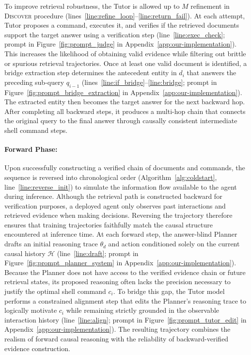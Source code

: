 \documentclass{article} %
\begin{document}
To improve retrieval robustness, the Tutor is allowed up to $M$ refinement in \textsc{Discover} procedure (lines~\ref{line:refine_loop}--\ref{line:return_fail}). At each attempt, Tutor proposes a command, executes it, and verifies if the retrieved documents support the target answer using a verification step (line~\ref{line:exec_check}; prompt in Figure~\ref{fig:prompt_judge} in Appendix~\ref{app:our-implementation}). This increases the likelihood of obtaining valid evidence while filtering out brittle or spurious retrieval trajectories. Once at least one valid document is identified, a bridge extraction step determines the antecedent entity in $d_i$ that answers the preceding sub-query $q_{i-1}$ (lines~\ref{line:if_bridge}--\ref{line:bridge}; prompt in Figure~\ref{fig:prompt_bridge_extraction} in Appendix~\ref{app:our-implementation}). The extracted entity then becomes the target answer for the next backward hop. After completing all backward steps, it produces a multi-hop chain that connects the original query to the final answer through causally consistent intermediate shell command steps.

\paragraph{Forward Phase:}

Upon successfully constructing a verified chain of documents and commands, the sequence is reversed into chronological order (Algorithm~\ref{alg:coldstart}, line~\ref{line:reverse_init}) to simulate the information flow available to the agent during inference. Although the retrieval path is constructed backward for verification purposes, a deployed agent only observes past interactions and retrieved evidence when making decisions. Reversing the trajectory therefore ensures that training trajectories faithfully match the causal structure encountered at inference time. At each forward step, the answer-blind Planner drafts an initial reasoning trace $\theta_d$ and action conditioned solely on the current causal history $\mathcal{H}$ (line~\ref{line:draft}; prompt in Figure~\ref{fig:prompt_planner_system} in Appendix~\ref{app:our-implementation}). Because the Planner does not have access to the verified evidence chain or future retrieval states, its proposed reasoning often lacks the precision necessary to justify the optimal shell command $c_i$. To bridge this gap, the Tutor model performs a constrained alignment step that edits the Planner's reasoning trace to logically motivate $c_i$ while remaining strictly grounded in the observable interaction history (line~\ref{line:align}; prompt in Figure~\ref{fig:prompt_tutor_edit} in Appendix~\ref{app:our-implementation}). The resulting trajectory combines the realism of forward causal reasoning with the reliability of backward-verified evidence construction.
\end{document}
